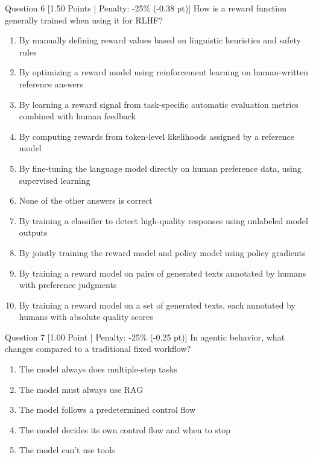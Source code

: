 \documentclass[11pt,a4paper]{article}
\begin{document}
\vspace{1.2em}

\begin{questionbox}{Question 6 \hfill [1.50 Points | Penalty: -25\% (-0.38 pt)]}
How is a reward function generally trained when using it for RLHF?

\begin{enumerate}[label=\alph*., leftmargin=2em]
    \item By manually defining reward values based on linguistic heuristics and safety rules
    \item By optimizing a reward model using reinforcement learning on human-written reference answers
    \item By learning a reward signal from task-specific automatic evaluation metrics combined with human feedback
    \item By computing rewards from token-level likelihoods assigned by a reference model
    \item By fine-tuning the language model directly on human preference data, using supervised learning
    \item None of the other answers is correct
    \item By training a classifier to detect high-quality responses using unlabeled model outputs
    \item By jointly training the reward model and policy model using policy gradients
    \item By training a reward model on pairs of generated texts annotated by humans with preference judgments
    \item By training a reward model on a set of generated texts, each annotated by humans with absolute quality scores
\end{enumerate}
\end{questionbox}

\vspace{1.2em}

\begin{questionbox}{Question 7 \hfill [1.00 Point | Penalty: -25\% (-0.25 pt)]}
In agentic behavior, what changes compared to a traditional fixed workflow?

\begin{enumerate}[label=\alph*., leftmargin=2em]
    \item The model always does multiple-step tasks
    \item The model must always use RAG
    \item The model follows a predetermined control flow
    \item The model decides its own control flow and when to stop
    \item The model can’t use tools
\end{enumerate}
\end{questionbox}
\end{document}
